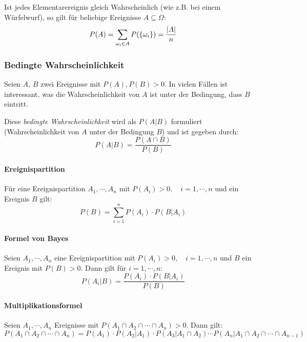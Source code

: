                 Ist jedes Elementarereignis gleich Wahrscheinlich (wie z.B. bei einem Würfelwurf), so gilt für beliebige Ereignisse \( A \subseteq \Omega \):
                \begin{equation*}
	                P(A) = \sum_{\omega_i \in A} P(\{ \omega_i \}) = \frac{\abs{A}}{n}
                \end{equation*}

            \subsubsection{Bedingte Wahrscheinlichkeit}
                Seien \(A\), \(B\) zwei Ereignisse mit \( P(A), P(B) > 0 \). In vielen Fällen ist interessant, was die Wahrscheinlichkeit von \(A\) ist unter der Bedingung, dass \(B\) eintritt.
                
                Diese \textit{bedingte Wahrscheinlichkeit} wird als \( P(A \vert B) \) formuliert (Wahrscheinlichkeit von \(A\) unter der Bedingung \(B\)) und ist gegeben durch:
                \begin{equation*}
                    P(A \vert B) = \frac{P(A \cap B)}{P(B)}
                \end{equation*}

				\paragraph{Ereignispartition}
					Für eine Ereignispartition \( A_1, \cdots, A_n \) mit \( P(A_i) > 0, \quad i = 1, \cdots, n \) und ein Ereignis \(B\) gilt:
					\begin{equation*}
						P(B) = \sum_{i = 1}^{n} P(A_i) \cdot P(B \vert A_i)
					\end{equation*}

                \paragraph{Formel von Bayes}
                    Seien \( A_1, \cdots, A_n \) eine Ereignispartition mit \( P(A_i) > 0, \quad i = 1, \cdots, n \) und \(B\) ein Ereignis mit \(P(B) > 0\). Dann gilt für \( i = 1, \cdots, n \):
                    \begin{equation*}
                        P(A_i \vert B) = \frac{P(A_i) \cdot P(B \vert A_i)}{P(B)}
                    \end{equation*}

                \paragraph{Multiplikationsformel}
                    Seien \( A_1, \cdots, A_n \) Ereignisse mit \( P(A_1 \cap A_2 \cap \cdots \cap A_n) > 0 \). Dann gilt:
                    \begin{equation*}
                        P(A_1 \cap A_2 \cap \cdots \cap A_n) = P(A_1) \cdot P(A_2 \vert A_1) \cdot P(A_3 \vert A_1 \cap A_2) \cdots P(A_n \vert A_1 \cap A_2 \cap \cdots \cap A_{n - 1})
                    \end{equation*}


